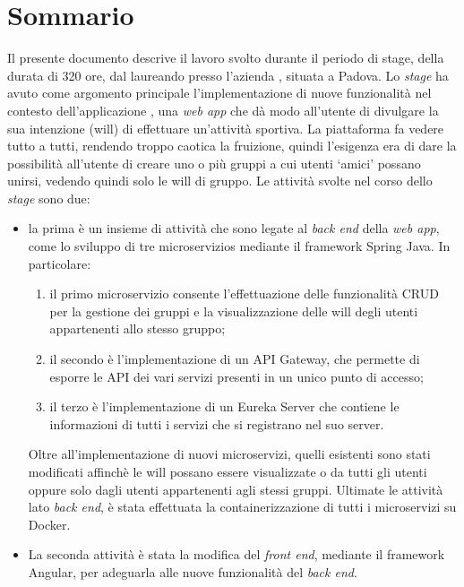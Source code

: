 
\cleardoublepage
{}
{}
\begingroup
\let\clearpage\relax
\let\cleardoublepage\relax
\let\cleardoublepage\relax

\chapter*{Sommario}

Il presente documento descrive il lavoro svolto durante il periodo di stage, della durata di 320 ore, dal laureando \myName\xspace presso
 l'azienda \myCompany, situata a Padova.
Lo \textit{stage} ha avuto come argomento principale l'implementazione di nuove funzionalità nel contesto dell'applicazione \productName, una
\textit{web app} che dà modo all'utente di divulgare la sua intenzione (\gls{will}) di effettuare un'attività sportiva.
La piattaforma fa vedere tutto a tutti, rendendo troppo caotica la fruizione, quindi l'esigenza era di dare la possibilità all'utente 
di creare uno o più gruppi a cui utenti \enquote*{amici} possano unirsi, vedendo quindi solo le \gls{will} di gruppo.
Le attività svolte nel corso dello \textit{stage} sono due:
\begin{itemize}
    \item la prima è un insieme di attività che sono legate al \textit{back end} della \textit{web app}, come lo sviluppo di tre \glspl{microservizio} mediante il \gls{framework} \gls{Spring} Java. 
    In particolare: 
        \begin{enumerate}
            \item il primo microservizio consente l'effettuazione delle funzionalità \gls{CRUD} per la gestione dei gruppi e la visualizzazione delle \gls{will} 
            degli utenti appartenenti allo stesso gruppo;
            \item il secondo è l'implementazione di un \gls{API Gateway}, che permette di esporre le \gls{API} dei vari servizi presenti in un 
            unico punto di accesso;
            \item il terzo è l'implementazione di un \gls{Eureka Server} che contiene le informazioni di tutti i servizi che si registrano nel suo server.
        \end{enumerate}
    Oltre all'implementazione di nuovi microservizi, quelli esistenti sono stati modificati affinchè le \gls{will} possano
    essere visualizzate o da tutti gli utenti oppure solo dagli utenti appartenenti agli stessi gruppi. 
    Ultimate le attività lato \textit{back end}, è stata effettuata la \gls{containerizzazione} di tutti i microservizi su Docker.
    \item La seconda attività è stata la modifica del \textit{front end}, mediante il framework \gls{Angular}, per adeguarla alle nuove funzionalità del \textit{back end}.
\end{itemize}
